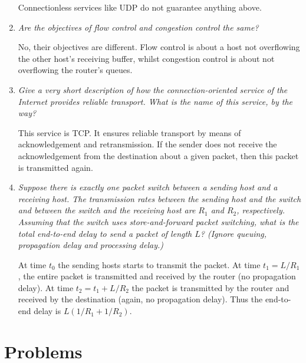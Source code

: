 \documentclass[11pt,a4paper]{article}
\begin{document}
\begin{enumerate}
   Connectionless services like UDP do not guarantee anything above.

  \item \emph{Are the objectives of flow control and congestion
  control the same?}

  No, their objectives are different. Flow control is about a host not
  overflowing the other host's receiving buffer, whilst congestion
  control is about not overflowing the router's queues.

  \item \emph{Give a very short description of how the
  connection-oriented service of the Internet provides reliable
  transport. What is the name of this service, by the way?}

  This service is TCP. It ensures reliable transport by means of
  acknowledgement and retransmission. If the sender does not receive
  the acknowledgement from the destination about a given packet, then
  this packet is transmitted again.

  \item \emph{Suppose there is exactly one packet switch between a
  sending host and a receiving host. The transmission rates between
  the sending host and the switch and between the switch and the
  receiving host are \(R_1\) and \(R_2\), respectively. Assuming that
  the switch uses store-and-forward packet switching, what is the
  total end-to-end delay to send a packet of length \(L\)? (Ignore
  queuing, propagation delay and processing delay.)}

  At time \(t_0\) the sending hosts starts to transmit the packet. At
  time \(t_1 = L/R_1\), the entire packet is transmitted and received
  by the router (no propagation delay). At time \(t_2 = t_1 + L/R_2\)
  the packet is transmitted by the router and received by the
  destination (again, no propagation delay). Thus the end-to-end delay
  is \(L(1/R_1 + 1/R_2)\).

\end{enumerate}

\section{Problems}
\end{document}
